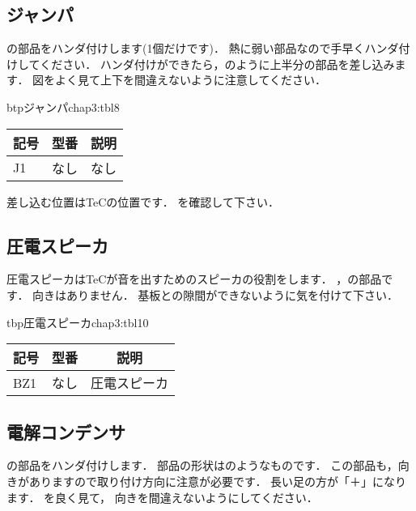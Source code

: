 
\subsection{ジャンパ}
の部品をハンダ付けします(1個だけです)．
熱に弱い部品なので手早くハンダ付けしてください．
ハンダ付けができたら，のように上半分の部品を差し込みます．
図をよく見て上下を間違えないように注意してください．

\begin{mytable}{btp}{ジャンパ}{chap3:tbl8}
{\small\begin{tabular}{l|l|l}
\hline
\hline
\multicolumn{1}{c|}{記号} &
\multicolumn{1}{c|}{型番} &
\multicolumn{1}{c}{説明} \\
\hline
J1 & なし &  なし \\
\end{tabular}}
\end{mytable}

差し込む位置はTeCの位置です．
を確認して下さい．


\subsection{圧電スピーカ}
圧電スピーカはTeCが音を出すためのスピーカの役割をします．
，の部品です．
向きはありません．
基板との隙間ができないように気を付けて下さい．

\begin{mytable}{tbp}{圧電スピーカ}{chap3:tbl10}
{\small\begin{tabular}{l|l|l}
\hline
\hline
\multicolumn{1}{c|}{記号} &
\multicolumn{1}{c|}{型番} &
\multicolumn{1}{c}{説明} \\
\hline
BZ1 & なし & 圧電スピーカ \\
\end{tabular}}
\end{mytable}


\subsection{電解コンデンサ}
の部品をハンダ付けします．
部品の形状はのようなものです．
この部品も，向きがありますので取り付け方向に注意が必要です．
長い足の方が「＋」になります．
を良く見て，
向きを間違えないようにしてください．

